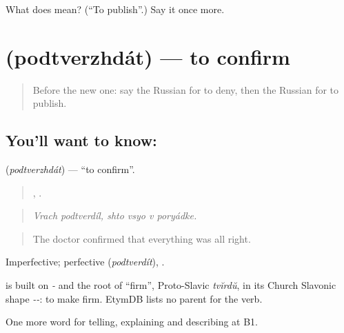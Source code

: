 \begin{tcolorbox}[breakable,colback=teal!4,colframe=teal!35!black,title={Before you move on}]
What does  mean? (\textquotedblleft{}To publish\textquotedblright{}.) Say it once more.
\end{tcolorbox}
\section[\texorpdfstring{\ru{подтверждать} (podtverzhdát)}{подтверждать (podtverzhdát)}]{ (podtverzhdát) — to confirm}

\label{lesson:RU-C280-podtverzhdat}



\begin{quote}
Before the new one: say the Russian for to deny, then the Russian for to publish.
\end{quote}

\subsection*{You'll want to know: }
\textbf{} (\emph{podtverzhdát}) — \textquotedblleft{}to confirm\textquotedblright{}.

\begin{quote}
 ,    .
\end{quote}

\begin{quote}
\emph{Vrach podtverdíl, shto vsyo v poryádke.}
\end{quote}

\begin{quote}
The doctor confirmed that everything was all right.
\end{quote}

Imperfective; perfective \emph{} (\emph{podtverdít}), \emph{ }.

\begin{cousinweb}
\emph{} is built on \emph{-} and the root of \emph{} \textquotedblleft{}firm\textquotedblright{}, Proto-Slavic \emph{tvĭrdŭ}, in its Church Slavonic shape \emph{--}: to make firm. EtymDB lists no parent for the verb.
\end{cousinweb}

\begin{grammarlens}[title={What you've built}]
One more word for telling, explaining and describing at B1.
\end{grammarlens}

